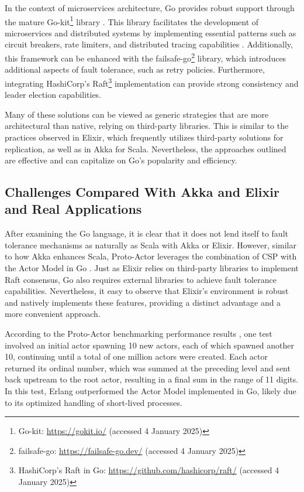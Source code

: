 In the context of microservices architecture, Go provides robust support through the mature Go-kit\footnote{Go-kit: \url{https://gokit.io/} (accessed 4 January 2025)} library \cite{go-kit-docs}. This library facilitates the development of microservices and distributed systems by implementing essential patterns such as circuit breakers, rate limiters, and distributed tracing capabilities \cite{go-kit-docs, Shuiskov2022}. Additionally, this framework can be enhanced with the failsafe-go\footnote{failsafe-go: \url{https://failsafe-go.dev/} (accessed 4 January 2025)} library, which introduces additional aspects of fault tolerance, such as retry policies. Furthermore, integrating HashiCorp's Raft\footnote{HashiCorp's Raft in Go: \url{https://github.com/hashicorp/raft/} (accessed 4 January 2025)} implementation can provide strong consistency and leader election capabilities.

Many of these solutions can be viewed as generic strategies that are more architectural than native, relying on third-party libraries. This is similar to the practices observed in Elixir, which frequently utilizes third-party solutions for replication, as well as in Akka for Scala. Nevertheless, the approaches outlined are effective and can capitalize on Go's popularity and efficiency.

\subsection{Challenges Compared With Akka and Elixir and Real Applications}

After examining the Go language, it is clear that it does not lend itself to fault tolerance mechanisms as naturally as Scala with Akka or Elixir. However, similar to how Akka enhances Scala, Proto-Actor leverages the combination of CSP with the Actor Model in Go \cite{proto-actor-docs}. Just as Elixir relies on third-party libraries to implement Raft consensus, Go also requires external libraries to achieve fault tolerance capabilities. Nevertheless, it easy to observe that Elixir's environment is robust and natively implements these features, providing a distinct advantage and a more convenient approach.

According to the Proto-Actor benchmarking performance results \cite{proto-actor-docs}, one test involved an initial actor spawning 10 new actors, each of which spawned another 10, continuing until a total of one million actors were created. Each actor returned its ordinal number, which was summed at the preceding level and sent back upstream to the root actor, resulting in a final sum in the range of 11 digits. In this test, Erlang outperformed the Actor Model implemented in Go, likely due to its optimized handling of short-lived processes.


